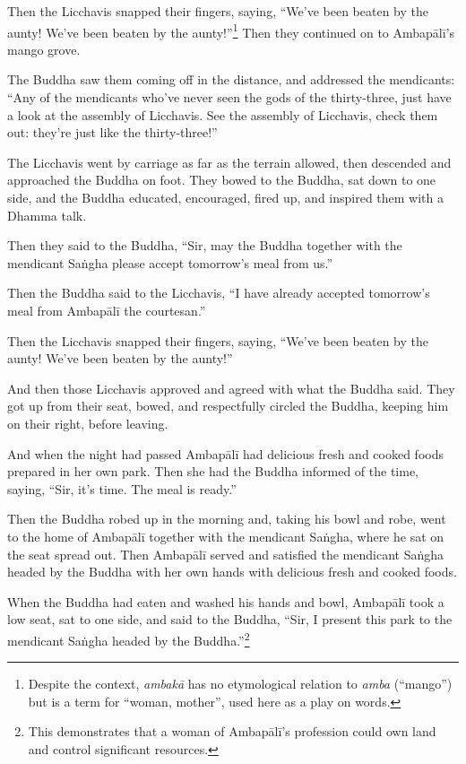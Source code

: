 \documentclass[12pt,openany]{book}%
\begin{document}
Then the Licchavis snapped their fingers, saying, “We’ve been beaten by the aunty! We’ve been beaten by the aunty!”\footnote{Despite the context, \textit{\textsanskrit{ambakā}} has no etymological relation to \textit{amba} (“mango”) but is a term for “woman, mother”, used here as a play on words. } Then they continued on to \textsanskrit{Ambapālī}’s mango grove. 

The Buddha saw them coming off in the distance, and addressed the mendicants: “Any of the mendicants who’ve never seen the gods of the thirty-three, just have a look at the assembly of Licchavis. See the assembly of Licchavis, check them out: they’re just like the thirty-three!” 

The Licchavis went by carriage as far as the terrain allowed, then descended and approached the Buddha on foot. They bowed to the Buddha, sat down to one side, and the Buddha educated, encouraged, fired up, and inspired them with a Dhamma talk. 

Then they said to the Buddha, “Sir, may the Buddha together with the mendicant \textsanskrit{Saṅgha} please accept tomorrow’s meal from us.” 

Then the Buddha said to the Licchavis, “I have already accepted tomorrow’s meal from \textsanskrit{Ambapālī} the courtesan.” 

Then the Licchavis snapped their fingers, saying, “We’ve been beaten by the aunty! We’ve been beaten by the aunty!” 

And then those Licchavis approved and agreed with what the Buddha said. They got up from their seat, bowed, and respectfully circled the Buddha, keeping him on their right, before leaving. 

And when the night had passed \textsanskrit{Ambapālī} had delicious fresh and cooked foods prepared in her own park. Then she had the Buddha informed of the time, saying, “Sir, it’s time. The meal is ready.” 

Then the Buddha robed up in the morning and, taking his bowl and robe, went to the home of \textsanskrit{Ambapālī} together with the mendicant \textsanskrit{Saṅgha}, where he sat on the seat spread out. Then \textsanskrit{Ambapālī} served and satisfied the mendicant \textsanskrit{Saṅgha} headed by the Buddha with her own hands with delicious fresh and cooked foods. 

When the Buddha had eaten and washed his hands and bowl, \textsanskrit{Ambapālī} took a low seat, sat to one side, and said to the Buddha, “Sir, I present this park to the mendicant \textsanskrit{Saṅgha} headed by the Buddha.”\footnote{This demonstrates that a woman of \textsanskrit{Ambapālī}’s profession could own land and control significant resources. } 
\end{document}
